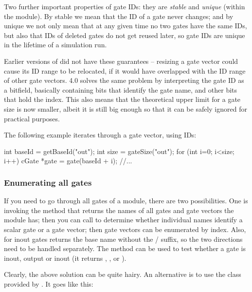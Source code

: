 Two further important properties of gate IDs: they are \textit{stable}
and \textit{unique} (within the module). By stable we mean that the ID
of a gate never changes; and by unique we not only mean that at any
given time no two gates have the same IDs, but also that IDs of deleted
gates do not get reused later, so gate IDs are unique in the lifetime
of a simulation run.

\begin{note}
    Earlier versions of {\opp} did not have these guarantees -- resizing
    a gate vector could cause its ID range to be relocated, if it
    would have overlapped with the ID range of other gate vectors.
    {\opp} 4.0 solves the same problem by interpreting the gate ID
    as a bitfield, basically containing bits that identify the gate name,
    and other bits that hold the index. This also means that the theoretical
    upper limit for a gate size is now smaller, albeit it is still
    big enough so that it can be safely ignored for practical purposes.
\end{note}

The following example iterates through a gate vector, using IDs:

\begin{cpp}
int baseId = getBaseId("out");
int size = gateSize("out");
for (int i=0; i<size; i++) {
    cGate *gate = gate(baseId + i);
    //...
}
\end{cpp}


\subsubsection{Enumerating all gates}

If you need to go through all gates of a module, there are
two possibilities. One is invoking the  method
that returns the names of all gates and gate vectors the module
has; then you can call  to determine
whether individual names identify a scalar gate or a gate vector;
then gate vectors can be enumerated by index. Also, for inout
gates  returns the base name without the
/ suffix, so the two directions
need to be handled separately. The  method
can be used to test whether a gate is inout, output or inout
(it returns , , or
).

Clearly, the above solution can be quite hairy. An alternative is to use
the  class provided by .
It goes like this:

